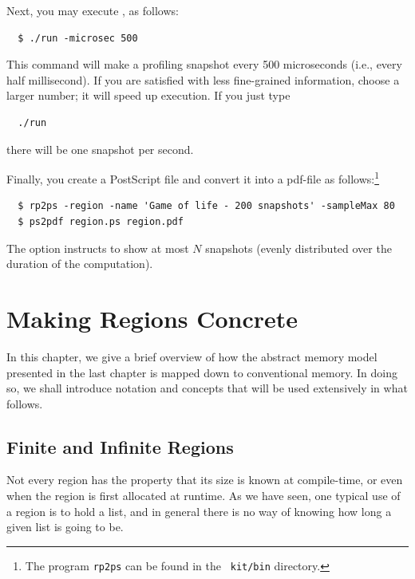 \documentclass[12pt]{book}
\begin{document}
Next, you may execute , as follows:
\begin{verbatim}
  $ ./run -microsec 500
\end{verbatim}
This command will make a profiling snapshot every 500 microseconds (i.e.,
every half millisecond). If you are satisfied with less fine-grained
information, choose a larger number; it will speed up execution. If
you just type
\begin{verbatim}
  ./run
\end{verbatim}
there will be one snapshot per second.

Finally, you create a PostScript file and convert it into a pdf-file as
follows:\footnote{The program {\tt rp2ps} can be found in the {\tt
    kit/bin} directory.}
%
\begin{verbatim}
  $ rp2ps -region -name 'Game of life - 200 snapshots' -sampleMax 80
  $ ps2pdf region.ps region.pdf
\end{verbatim}
The option  instructs  to show at
most $N$ snapshots (evenly distributed over the duration of the
computation).

\chapter{Making Regions Concrete}
In this chapter, we give a brief overview of how the abstract memory
model presented in the last chapter is mapped down to conventional
memory. In doing so, we shall introduce notation and concepts that
will be used extensively in what follows.


\section{Finite and Infinite Regions}
\label{fininf.sec}
Not every region has the property that its size is known at
compile-time, or even when the region is first allocated at runtime.
As we have seen, one typical use of a region is to hold a list, and in
general there is no way of knowing how long a given list is going to
be.
\end{document}

